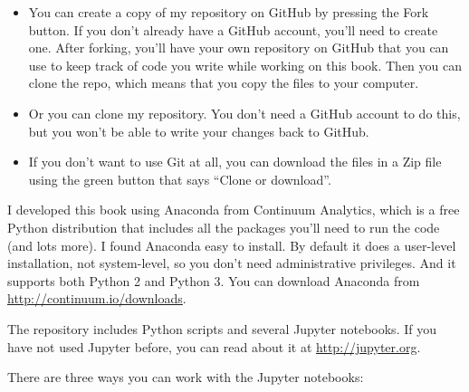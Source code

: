 \documentclass[12pt]{book}
\theoremstyle{exercise}
\begin{document}
\begin{itemize}

\item You can create a copy of my repository
on GitHub by pressing the {\sf Fork} button.  If you don't already
have a GitHub account, you'll need to create one.  After forking, you'll
have your own repository on GitHub that you can use to keep track
of code you write while working on this book.  Then you can
clone the repo, which means that you copy the files
to your computer.


\item Or you can clone my repository.  You don't need a GitHub account
  to do this, but you won't be able to write your changes back to
  GitHub.


\item If you don't want to use Git at all, you can download the files
  in a Zip file using the green button that says ``Clone or download''.

\end{itemize}

I developed this book using Anaconda from Continuum Analytics, which
is a free Python distribution that includes all the packages you'll
need to run the code (and lots more).  I found Anaconda easy to
install.  By default it does a user-level installation, not
system-level, so you don't need administrative privileges.  And it
supports both Python 2 and Python 3.  You can download Anaconda from
\url{http://continuum.io/downloads}.


The repository includes Python scripts and several Jupyter
notebooks.  If you have not used Jupyter before, you can read about
it at \url{http://jupyter.org}.


There are three ways you can work with the Jupyter notebooks:
\end{document}
